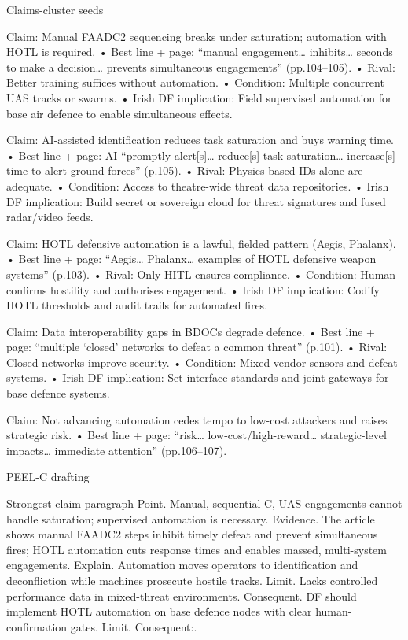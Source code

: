 Claims-cluster seeds

Claim: Manual FAADC2 sequencing breaks under saturation; automation with HOTL is required.
• Best line + page: “manual engagement… inhibits… seconds to make a decision… prevents simultaneous engagements” (pp.104–105). {\small }
• Rival: Better training suffices without automation.
• Condition: Multiple concurrent UAS tracks or swarms.
• Irish DF implication: Field supervised automation for base air defence to enable simultaneous effects.

Claim: AI-assisted identification reduces task saturation and buys warning time.
• Best line + page: AI “promptly alert[s]… reduce[s] task saturation… increase[s] time to alert ground forces” (p.105). {\small }
• Rival: Physics-based IDs alone are adequate.
• Condition: Access to theatre-wide threat data repositories.
• Irish DF implication: Build secret or sovereign cloud for threat signatures and fused radar/video feeds.

Claim: HOTL defensive automation is a lawful, fielded pattern (Aegis, Phalanx).
• Best line + page: “Aegis… Phalanx… examples of HOTL defensive weapon systems” (p.103). {\small }
• Rival: Only HITL ensures compliance.
• Condition: Human confirms hostility and authorises engagement.
• Irish DF implication: Codify HOTL thresholds and audit trails for automated fires.

Claim: Data interoperability gaps in BDOCs degrade defence.
• Best line + page: “multiple ‘closed’ networks to defeat a common threat” (p.101). {\small }
• Rival: Closed networks improve security.
• Condition: Mixed vendor sensors and defeat systems.
• Irish DF implication: Set interface standards and joint gateways for base defence systems.

Claim: Not advancing automation cedes tempo to low-cost attackers and raises strategic risk.
• Best line + page: “risk… low-cost/high-reward… strategic-level impacts… immediate attention” (pp.106–107). {\small }

PEEL-C drafting

Strongest claim paragraph
Point. Manual, sequential C,-UAS engagements cannot handle saturation; supervised automation is necessary.
Evidence. The article shows manual FAADC2 steps inhibit timely defeat and prevent simultaneous fires; HOTL automation cuts response times and enables massed, multi-system engagements. {\small }
Explain. Automation moves operators to identification and deconfliction while machines prosecute hostile tracks.
Limit. Lacks controlled performance data in mixed-threat environments.
Consequent. DF should implement HOTL automation on base defence nodes with clear human-confirmation gates. Limit. Consequent:.

